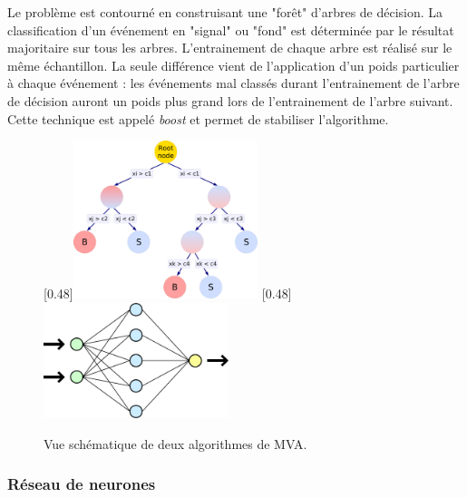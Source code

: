 Le problème est contourné en construisant une "forêt" d'arbres de décision. La classification d'un événement en "signal" ou "fond" est déterminée par le résultat majoritaire sur tous les arbres. L'entrainement de chaque arbre est réalisé sur le même échantillon. La seule différence vient de l'application d'un poids particulier à chaque événement : les événements mal classés durant l'entrainement de l'arbre de décision auront un poids plus grand lors de l'entrainement de l'arbre suivant. Cette technique est appelé \emph{boost} \citep{Freund1997119} et permet de stabiliser l'algorithme.

\begin{figure}[t!] \centering
    [0.48\textwidth]{\includegraphics[width=0.48\textwidth]{chapitre6/figs/BDT.pdf}} \hfill
    [0.48\textwidth]{\includegraphics[width=0.48\textwidth]{chapitre6/figs/Neural_network.pdf}}
    \caption{Vue schématique de deux algorithmes de MVA.}
\end{figure}

\subsubsection{Réseau de neurones} 

